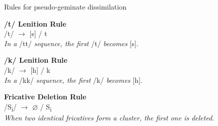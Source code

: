 \begin{exe}
\item\label{rulesPseudoGeminate} Rules for pseudo-geminate dissimilation

	\begin{xlist}

	\item\label{rulesPseudoGeminate1} \textbf{/t/ Lenition Rule}\\
	 /t/ $\to$ [s] / {\longrule}t\\
	\textit{In a} /tt/ \textit{sequence, the first} /t/ \textit{becomes} [s].

	\item\label{rulesPseudoGeminate2} \textbf{/k/ Lenition Rule}\\
	/k/ $\to$ [h] / {\longrule}k\\
	\textit{In a} /kk/ \textit{sequence, the first} /k/ \textit{becomes} [h].

	\item\label{rulesPseudoGeminate3} \textbf{Fricative Deletion Rule}\\
	/S\textsubscript{i}/ $\to$ $\varnothing$ / {\longrule}S\textsubscript{i}\\
	\textit{When two identical fricatives form a cluster, the first one is deleted.}

	\end{xlist}

\end{exe}

